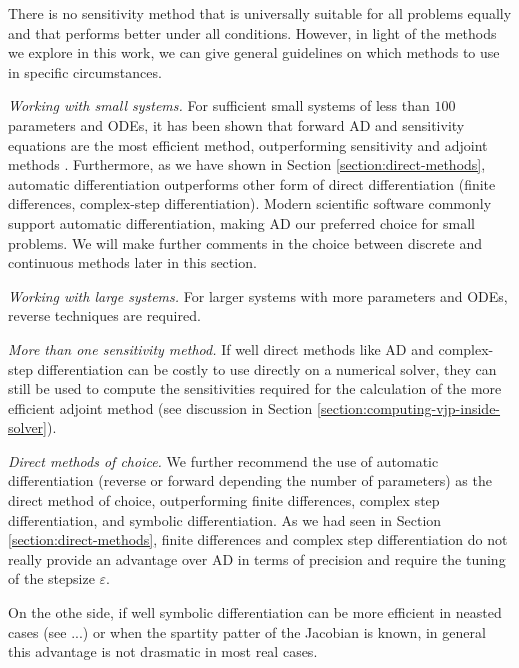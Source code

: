 There is no sensitivity method that is universally suitable for all problems equally and that performs better under all conditions. 
However, in light of the methods we explore in this work, we can give general guidelines on which methods to use in specific circumstances.

\vspace{5px}
\noindent\textit{Working with small systems. }
For sufficient small systems of less than $100$ parameters and ODEs, it has been shown that forward AD and sensitivity equations are the most efficient method, outperforming sensitivity and adjoint methods \cite{ma2021comparison}.
Furthermore, as we have shown in Section \ref{section:direct-methods}, automatic differentiation outperforms other form of direct differentiation (finite differences, complex-step differentiation). 
Modern scientific software commonly support automatic differentiation, making AD our preferred choice for small problems. 
We will make further comments in the choice between discrete and continuous methods later in this section.

\vspace{5px}
\noindent\textit{Working with large systems. }
For larger systems with more parameters and ODEs, reverse techniques are required. 

\vspace{5px}
\noindent\textit{More than one sensitivity method. }
If well direct methods like AD and complex-step differentiation can be costly to use directly on a numerical solver, they can still be used to compute the sensitivities required for the calculation of the more efficient adjoint method (see discussion in Section \ref{section:computing-vjp-inside-solver}). 

\vspace{5px}
\noindent\textit{Direct methods of choice. }
We further recommend the use of automatic differentiation (reverse or forward depending the number of parameters) as the direct method of choice, outperforming finite differences, complex step differentiation, and symbolic differentiation. 
As we had seen in Section \ref{section:direct-methods}, finite differences and complex step differentiation do not really provide an advantage over AD in terms of precision and require the tuning of the stepsize $\varepsilon$. 

On the othe side, if well symbolic differentiation can be more efficient in neasted cases (see ...) or when the spartity patter of the Jacobian is known, in general this advantage is not drasmatic in most real cases. 


